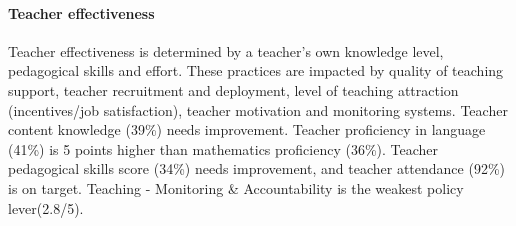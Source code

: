 \documentclass[twocolumn]{article}
\let\oldparagraph\paragraph
\renewcommand{\paragraph}[1]{\oldparagraph{#1}\mbox{}}
\begin{document}
\hypertarget{teacher-effectiveness}{%
\paragraph{\texorpdfstring{\textbf{Teacher
effectiveness}}{Teacher effectiveness}}\label{teacher-effectiveness}}

Teacher effectiveness is determined by a teacher's own knowledge level,
pedagogical skills and effort. These practices are impacted by quality
of teaching support, teacher recruitment and deployment, level of
teaching attraction (incentives/job satisfaction), teacher motivation
and monitoring systems. Teacher content knowledge (39\%) needs
improvement. Teacher proficiency in language (41\%) is 5 points higher
than mathematics proficiency (36\%). Teacher pedagogical skills score
(34\%) needs improvement, and teacher attendance (92\%) is on target.
Teaching - Monitoring \& Accountability is the weakest policy
lever(2.8/5).
\end{document}
